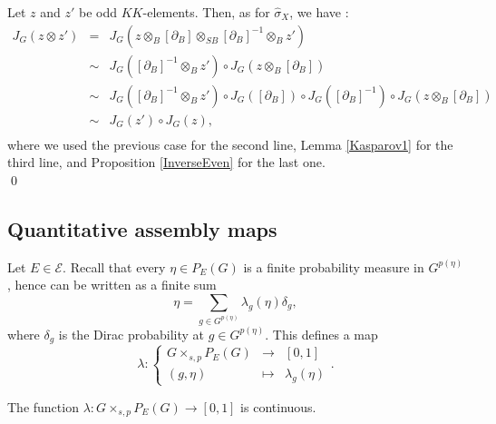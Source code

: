 \begin{dem}
Let $z$ and $z'$ be odd $KK$-elements. Then, as for $\hat\sigma_X$, we have :
\[\begin{array}{rcl}
J_G (z\otimes z') & = &  J_G (z\otimes_B [\partial_{B}]\otimes_{SB} [\partial_B]^{-1}\otimes_B z') \\
			& \sim & J_G ( [\partial_B]^{-1}\otimes_B z')\circ J_G (z\otimes_B [\partial_{B}])\\
			& \sim & J_G ( [\partial_B]^{-1}\otimes_B z')\circ J_G ( [\partial_B])\circ J_G( [\partial_B]^{-1})\circ J_G (z\otimes_B [\partial_{B}])\\		
			& \sim & J_G (  z')\circ J_G (z),\\
\end{array}\] 
where we used the previous case for the second line, Lemma \ref{Kasparov1} for the third line, and Proposition \ref{InverseEven} for the last one.\\
\qed
\end{dem}

\subsection{Quantitative assembly maps}

Let $E\in\mathcal E$. Recall that every $\eta\in P_E(G)$ is a finite probability measure in $G^{p(\eta)}$, hence can be written as a finite sum 
\[\eta = \sum_{g\in G^{p(\eta)}}\lambda_g(\eta)\delta_g,\]
where $\delta_g$ is the Dirac probability at $g\in G^{p(\eta)}$. This defines a map 
\[\lambda : \left\{\begin{array}{rcl}
G\times_{s,p} P_E(G) & \rightarrow & [0,1] \\
 (g,\eta) & \mapsto & \lambda_g(\eta)\end{array}\right. .\] 

\begin{lem}
The function $\lambda : G\times_{s,p} P_E(G) \rightarrow [0,1]$ is continuous. 
\end{lem}

